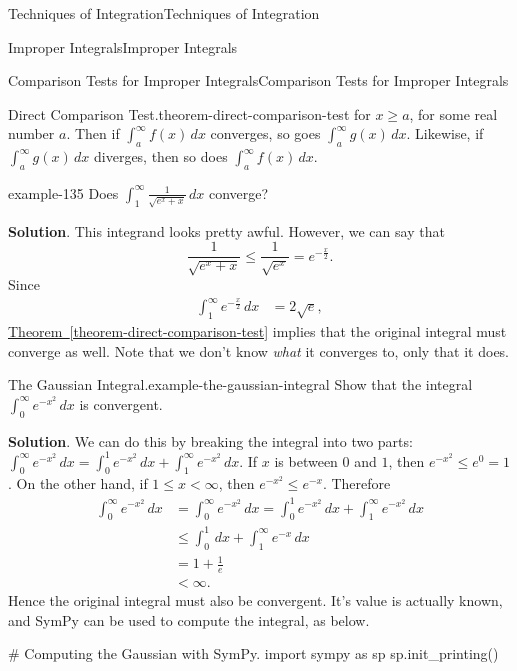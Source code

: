 \documentclass[10pt,]{book}
\numberwithin{equation}{section}
\newcommand{\lt}{<}
\begin{document}
\begin{chapterptx}{Techniques of Integration}{}{Techniques of Integration}{}{}
\begin{sectionptx}{Improper Integrals}{}{Improper Integrals}{}{}
\begin{subsectionptx}{Comparison Tests for Improper Integrals}{}{Comparison Tests for Improper Integrals}{}{}
\begin{theorem}{Direct Comparison Test.}{}{theorem-direct-comparison-test}
for \(x\geq a\), for some real number \(a\). Then if \(\int_{a}^{\infty}f(x)\,dx\) converges, so goes \(\int_{a}^{\infty}g(x)\,dx\). Likewise, if \(\int_{a}^{\infty}g(x)\,dx\) diverges, then so does \(\int_{a}^{\infty}f(x)\,dx\).%
\end{theorem}
\begin{example}{}{example-135}%
\hypertarget{p-604}{}%
Does \(\int_{1}^{\infty}\frac{1}{\sqrt{e^{x} + x}}\,dx\) converge?%
\par\smallskip%
\noindent\textbf{Solution}.\hypertarget{solution-131}{}\quad%
\hypertarget{p-605}{}%
This integrand looks pretty awful. However, we can say that%
\begin{equation*}
\frac{1}{\sqrt{e^{x} + x}} \leq \frac{1}{\sqrt{e^{x}}} = e^{-\frac{x}{2}}.
\end{equation*}
Since%
\begin{align*}
\int_{1}^{\infty}e^{-\frac{x}{2}}\,dx & = 2\sqrt{e}, 
\end{align*}
\hyperref[theorem-direct-comparison-test]{Theorem~\ref{theorem-direct-comparison-test}} implies that the original integral must converge as well. Note that we don't know \emph{what} it converges to, only that it does.%
\end{example}
\begin{example}{The Gaussian Integral.}{example-the-gaussian-integral}%
\hypertarget{p-606}{}%
Show that the integral \(\int_{0}^{\infty}e^{-x^{2}}\,dx\) is convergent.%
\par\smallskip%
\noindent\textbf{Solution}.\hypertarget{solution-132}{}\quad%
\hypertarget{p-607}{}%
We can do this by breaking the integral into two parts: \(\int_{0}^{\infty}e^{-x^{2}}\,dx = \int_{0}^{1}e^{-x^{2}}\,dx + \int_{1}^{\infty}e^{-x^{2}}\,dx.\) If \(x\) is between \(0\) and \(1\), then \(e^{-x^{2}} \leq e^{0} = 1\). On the other hand, if \(1\leq x\lt \infty\), then \(e^{-x^{2}} \leq e^{-x}\). Therefore%
\begin{align*}
\int_{0}^{\infty}e^{-x^{2}}\,dx & = \int_{0}^{\infty}e^{-x^{2}}\,dx = \int_{0}^{1}e^{-x^{2}}\,dx + \int_{1}^{\infty}e^{-x^{2}}\,dx\\
& \leq \int_{0}^{1}\,dx + \int_{1}^{\infty}e^{-x}\,dx \\
& = 1 + \frac{1}{e} \\
& \lt \infty.
\end{align*}
Hence the original integral must also be convergent. It's value is actually known, and SymPy can be used to compute the integral, as below.%
\end{example}
\begin{sageinput}
# Computing the Gaussian with SymPy.
import sympy as sp
sp.init_printing()


\end{sageinput}
\end{subsectionptx}
\end{sectionptx}
\end{chapterptx}
\end{document}
